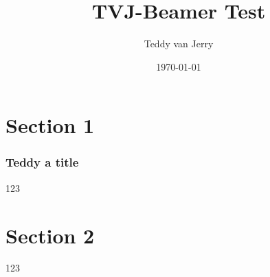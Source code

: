 \documentclass[12pt,aspectratio=169]{TVJ-Beamer}
\title{TVJ-Beamer Test}
\author{Teddy van Jerry}
\date{\today}
\begin{document}
\begin{frame}
  \maketitle
\end{frame}
\section{Section 1}
\begin{frame}
  \frametitle{Teddy a title}
  123
\end{frame}
\section{Section 2}
\begin{frame}
  \begin{theorem}[title]
    123
  \end{theorem}
\end{frame}
\end{document}
